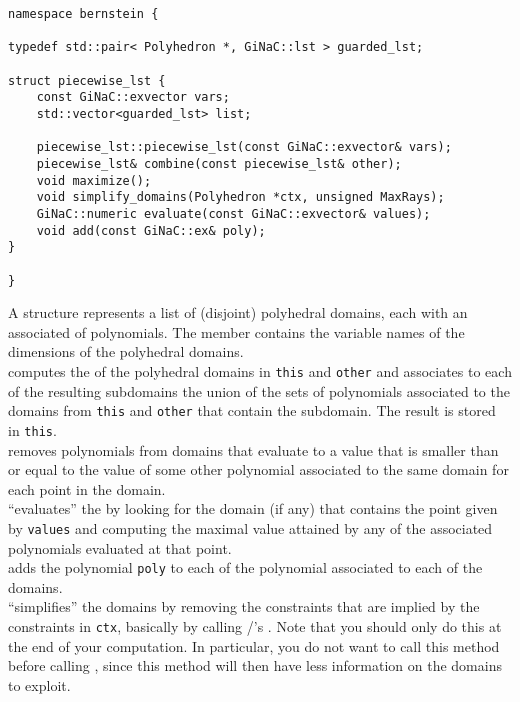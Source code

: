 \begin{verbatim}
namespace bernstein {

typedef std::pair< Polyhedron *, GiNaC::lst > guarded_lst;

struct piecewise_lst {
    const GiNaC::exvector vars;
    std::vector<guarded_lst> list;

    piecewise_lst::piecewise_lst(const GiNaC::exvector& vars);
    piecewise_lst& combine(const piecewise_lst& other);
    void maximize();
    void simplify_domains(Polyhedron *ctx, unsigned MaxRays);
    GiNaC::numeric evaluate(const GiNaC::exvector& values);
    void add(const GiNaC::ex& poly);
}

}
\end{verbatim}
A  structure represents a list of (disjoint)
polyhedral domains, each with an associated 
of polynomials.
The  member contains the variable names of the
dimensions of the polyhedral domains.
\\
 computes the 
of the polyhedral domains in \verb+this+ and \verb+other+ and associates
to each of the resulting subdomains the union of the sets of polynomials
associated to the domains from \verb+this+ and \verb+other+ that contain
the subdomain.
The result is stored in \verb+this+.
\\
 removes polynomials from domains that evaluate
to a value that is smaller than or equal to the value of some
other polynomial associated to the same domain for each point in the domain.
\\
 ``evaluates'' the 
by looking for the domain (if any) that contains the point given by
\verb+values+ and computing the maximal value attained by any of the
associated polynomials evaluated at that point.
\\
 adds the polynomial \verb+poly+
to each of the polynomial associated to each of the domains.
\\
 ``simplifies'' the domains
by removing the constraints that are implied by the constraints
in \verb+ctx+, basically by calling \PolyLib/'s
.  Note that you should only do this
at the end of your computation.  In particular, you do not
want to call this method before calling
, since this method will then
have less information on the domains to exploit.


